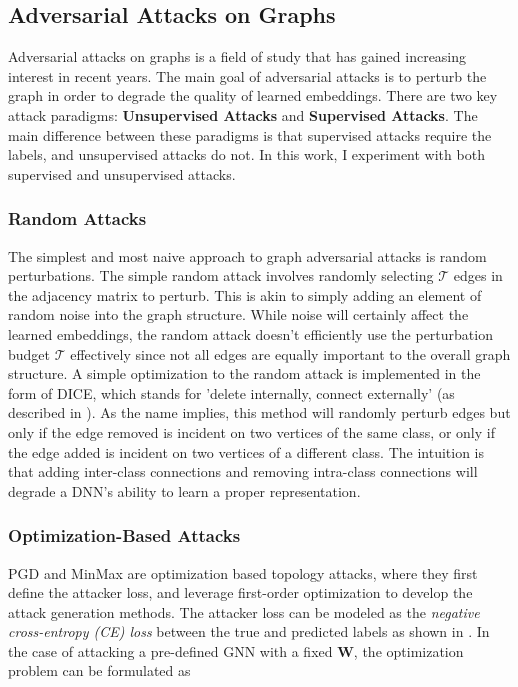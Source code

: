 \documentclass{article}
\begin{document}
\subsection{Adversarial Attacks on Graphs}

Adversarial attacks on graphs is a field of study that has gained increasing interest in recent years. The main goal of adversarial attacks is to perturb the graph in order to degrade the quality of learned embeddings. There are two key attack paradigms: \textbf{Unsupervised Attacks} and \textbf{Supervised Attacks}. The main difference between these paradigms is that supervised attacks require the labels, and unsupervised attacks do not. In this work, I experiment with both supervised and unsupervised attacks. 

\subsubsection{Random Attacks}

The simplest and most naive approach to graph adversarial attacks is random perturbations. The simple random attack involves randomly selecting $\mathcal{T}$ edges in the adjacency matrix to perturb.  This is akin to simply adding an element of random noise into the graph structure. While noise will certainly affect the learned embeddings, the random attack doesn't efficiently use the perturbation budget $\mathcal{T}$ effectively since not all edges are equally important to the overall graph structure. A simple optimization to the random attack is implemented in the form of DICE, which stands for 'delete internally, connect externally' (as described in \cite{zügner2024Metattack}). As the name implies, this method will randomly perturb edges but only if the edge removed is incident on two vertices of the same class, or only if the edge added is incident on two vertices of a different class. The intuition is that adding inter-class connections and removing intra-class connections will degrade a DNN's ability to learn a proper representation. 

\subsubsection{Optimization-Based Attacks}

PGD and MinMax \cite{xu2019topology} are optimization based topology attacks, where they first define the attacker loss, and leverage first-order optimization to develop the attack generation methods. The attacker loss can be modeled as the \emph{negative cross-entropy (CE) loss} between the true and predicted labels as shown in \cite{goodfellow2015explaining}. In the case of attacking a pre-defined GNN with a fixed $\mathbf{W}$, the optimization problem can be formulated as
\end{document}

